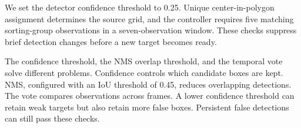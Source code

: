We set the detector confidence threshold to 0.25. Unique center-in-polygon assignment determines the source grid, and the controller requires five matching sorting-group observations in a seven-observation window. These checks suppress brief detection changes before a new target becomes ready.

The confidence threshold, the NMS overlap threshold, and the temporal vote solve different problems. Confidence controls which candidate boxes are kept. NMS, configured with an IoU threshold of 0.45, reduces overlapping detections. The vote compares observations across frames. A lower confidence threshold can retain weak targets but also retain more false boxes. Persistent false detections can still pass these checks.

